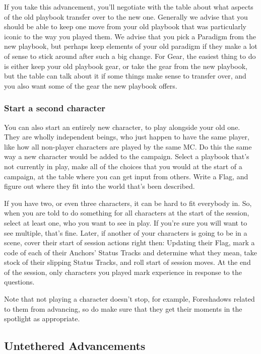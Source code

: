 \documentclass[
]{memoir}
\begin{document}
If you take this advancement, you'll negotiate with the table about what
aspects of the old playbook transfer over to the new one. Generally we
advise that you should be able to keep one move from your old playbook
that was particularly iconic to the way you played them. We advise that
you pick a Paradigm from the new playbook, but perhaps keep elements of
your old paradigm if they make a lot of sense to stick around after such
a big change. For Gear, the easiest thing to do is either keep your old
playbook gear, or take the gear from the new playbook, but the table can
talk about it if some things make sense to transfer over, and you also
want some of the gear the new playbook offers.

\hypertarget{start-a-second-character}{%
\subsubsection{Start a second
character}\label{start-a-second-character}}

You can also start an entirely new character, to play alongside your old
one. They are wholly independent beings, who just happen to have the
same player, like how all non-player characters are played by the same
MC. Do this the same way a new character would be added to the campaign.
Select a playbook that's not currently in play, make all of the choices
that you would at the start of a campaign, at the table where you can
get input from others. Write a Flag, and figure out where they fit into
the world that's been described.

If you have two, or even three characters, it can be hard to fit
everybody in. So, when you are told to do something for all characters
at the start of the session, select at least one, who you want to see in
play. If you're sure you will want to see multiple, that's fine. Later,
if another of your characters is going to be in a scene, cover their
start of session actions right then: Updating their Flag, mark a code of
each of their Anchors' Status Tracks and determine what they mean, take
stock of their slipping Status Tracks, and roll start of session moves.
At the end of the session, only characters you played mark experience in
response to the questions.

Note that not playing a character doesn't stop, for example, Foreshadows
related to them from advancing, so do make sure that they get their
moments in the spotlight as appropriate.

\hypertarget{untethered-advancements-1}{%
\subsection{Untethered Advancements}\label{untethered-advancements-1}}
\end{document}
